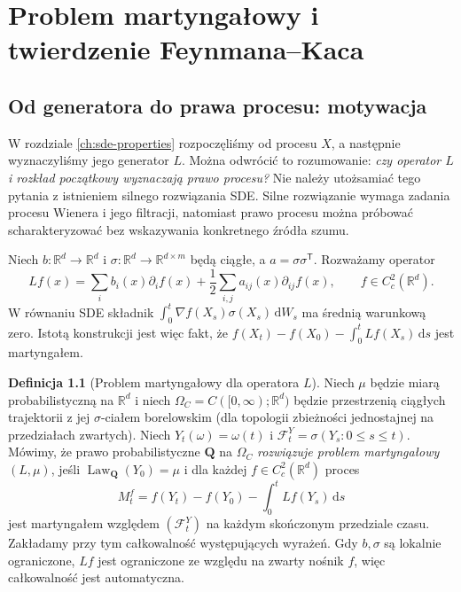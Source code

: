 \documentclass[11pt,a4paper,oneside]{report}
\numberwithin{equation}{chapter}
\theoremstyle{plain}
\theoremstyle{definition}
\newtheorem{definicja}{Definicja}[chapter]
\theoremstyle{remark}
\newcommand{\R}{\mathbb{R}}
\newcommand{\Law}{\operatorname{Law}}
\newcommand{\calF}{\mathcal{F}}
\newcommand{\dd}{\mathrm{d}}
\begin{document}
\chapter{Problem martyngałowy i twierdzenie Feynmana--Kaca}
\label{chap:volIII:07}
\par\smallskip{}\par\smallskip

\label{ch:martingale-fk}

\section{Od generatora do prawa procesu: motywacja}\label{sec:volIII:07:01}

W rozdziale \ref{ch:sde-properties} rozpoczęliśmy od procesu $X$, a następnie
wyznaczyliśmy jego generator $L$. Można odwrócić to rozumowanie:
\emph{czy operator $L$ i rozkład początkowy wyznaczają prawo procesu?}
Nie należy utożsamiać tego pytania z istnieniem silnego rozwiązania SDE.
Silne rozwiązanie wymaga zadania procesu Wienera i jego filtracji,
natomiast prawo procesu można próbować scharakteryzować bez wskazywania
konkretnego źródła szumu.

Niech $b:\R^d\to\R^d$ i $\sigma:\R^d\to\R^{d\times m}$ będą
ciągłe, a $a=\sigma\sigma^{\mathsf T}$. Rozważamy operator
\[
Lf(x)=\sum_i b_i(x)\partial_i f(x)
 +\frac12\sum_{i,j}a_{ij}(x)\partial_{ij}f(x),
 \qquad f\in C_c^2(\R^d).
\]
W równaniu SDE składnik $\int_0^t\nabla f(X_s)\sigma(X_s)\,\dd W_s$
ma średnią warunkową zero. Istotą konstrukcji jest więc fakt, że
$f(X_t)-f(X_0)-\int_0^tLf(X_s)\,\dd s$ jest martyngałem.

\begin{definicja}[Problem martyngałowy dla operatora $L$]\label{def:volIII:07:01}
\label{def:mp}
Niech $\mu$ będzie miarą probabilistyczną na $\R^d$ i niech
$\Omega_C=C([0,\infty);\R^d)$ będzie przestrzenią ciągłych trajektorii
z jej $\sigma$-ciałem borelowskim (dla topologii zbieżności jednostajnej
na przedziałach zwartych). Niech $Y_t(\omega)=\omega(t)$ i
$\calF_t^Y=\sigma(Y_s:0\le s\le t)$.
Mówimy, że prawo probabilistyczne $\mathbf Q$ na $\Omega_C$
\emph{rozwiązuje problem martyngałowy $(L,\mu)$}, jeśli
$\Law_{\mathbf Q}(Y_0)=\mu$ i dla każdej $f\in C_c^2(\R^d)$
proces
\[
M_t^f=f(Y_t)-f(Y_0)-\int_0^tLf(Y_s)\,\dd s
\]
jest martyngałem względem $(\calF_t^Y)$ na każdym skończonym
przedziale czasu. Zakładamy przy tym całkowalność występujących
wyrażeń. Gdy $b,\sigma$ są lokalnie ograniczone, $Lf$ jest ograniczone
ze względu na zwarty nośnik $f$, więc całkowalność jest automatyczna.
\end{definicja}
\end{document}
